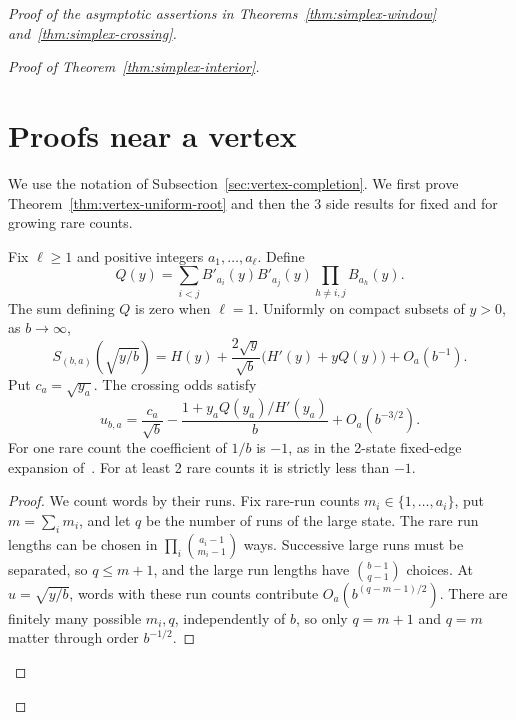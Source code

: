 \begin{proof}[Proof of the asymptotic assertions in
Theorems~\ref{thm:simplex-window} and~\ref{thm:simplex-crossing}]
\begin{proof}[Proof of Theorem~\ref{thm:simplex-interior}]
\section{Proofs near a vertex}
\label{app:vertex}

We use the notation of Subsection~\ref{sec:vertex-completion}. We first
prove Theorem~\ref{thm:vertex-uniform-root} and then the 3 side results
for fixed and for growing rare counts.

\begin{theorem}
\label{thm:simplex-fixed-vertex}
Fix $\ell\ge1$ and positive integers $a_1,\ldots,a_\ell$. Define
\[
Q(y)=\sum_{i<j}B'_{a_i}(y)B'_{a_j}(y)
\prod_{h\ne i,j}B_{a_h}(y).
\]
The sum defining $Q$ is zero when $\ell=1$. Uniformly on compact
subsets of $y>0$, as $b\to\infty$,
\begin{equation}\label{eq:simplex-vertex-ratio}
S_{(b,a)}\!\left(\sqrt{y/b}\right)
=H(y)+\frac{2\sqrt y}{\sqrt b}\bigl(H'(y)+yQ(y)\bigr)
+O_a(b^{-1}).
\end{equation}
Put $c_a=\sqrt{y_a}$. The crossing odds satisfy
\begin{equation}\label{eq:simplex-vertex-root}
u_{b,a}=\frac{c_a}{\sqrt b}
-\frac{1+y_aQ(y_a)/H'(y_a)}{b}
+O_a(b^{-3/2}).
\end{equation}
For one rare count the coefficient of $1/b$ is $-1$, as in the 2-state
fixed-edge expansion of~\cite{paperA}. For at least 2 rare counts it is
strictly less than $-1$.
\end{theorem}

\begin{proof}
We count words by their runs. Fix rare-run counts
$m_i\in\{1,\ldots,a_i\}$, put $m=\sum_im_i$, and let $q$ be the number of
runs of the large state. The rare run lengths can be chosen in
$\prod_i\binom{a_i-1}{m_i-1}$ ways. Successive large runs must be
separated, so $q\le m+1$, and the large run lengths have
$\binom{b-1}{q-1}$ choices. At $u=\sqrt{y/b}$, words with these run counts
contribute $O_a(b^{(q-m-1)/2})$. There are finitely many possible $m_i,q$,
independently of $b$, so only $q=m+1$ and $q=m$ matter through order
$b^{-1/2}$.


\end{proof}
\end{proof}
\end{proof}
